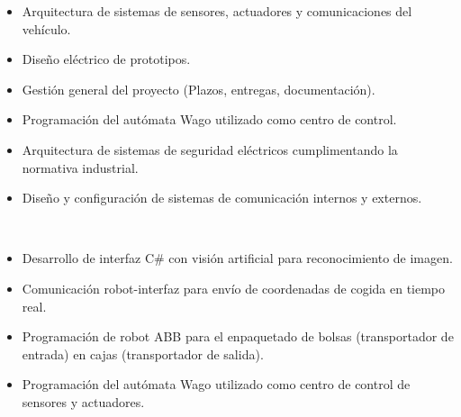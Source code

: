 \documentclass[10pt,a4paper,ragged2e]{altacv}
\begin{document}
    \begin{itemize}
      \item Arquitectura de sistemas de sensores, actuadores y comunicaciones del vehículo.
      \item Diseño eléctrico de prototipos.
      \item Gestión general del proyecto (Plazos, entregas, documentación).
      \item Programación del autómata Wago utilizado como centro de control.
      \item Arquitectura de sistemas de seguridad eléctricos cumplimentando la normativa industrial.
      \item Diseño y configuración de sistemas de comunicación internos y externos.
    \end{itemize}
    \begin{center}
      \vspace*{-0.2cm}
      \\
      \vspace*{-0.2cm}
    \end{center}
  \divider

    \begin{itemize}
      \item Desarrollo de interfaz C\# con visión artificial para reconocimiento de imagen.
      \item Comunicación robot-interfaz para envío de coordenadas de cogida en tiempo real.
      \item Programación de robot ABB para el enpaquetado de bolsas (transportador de entrada) en cajas (transportador de salida).
      \item Programación del autómata Wago utilizado como centro de control de sensores y actuadores.
    \end{itemize}
    \begin{center}
      \vspace*{-0.2cm}
      \vspace*{-0.2cm}
    \end{center}
  \divider
\end{document}

